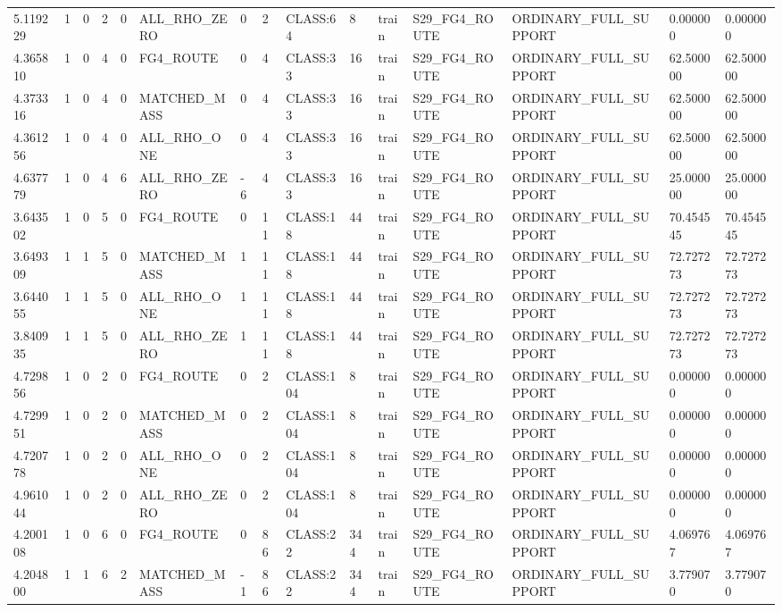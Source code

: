 \begin{tabular}{lllllllllllllll}
5.119229 & 1 & 0 & 2 & 0 & ALL\_RHO\_ZERO & 0 & 2 & CLASS:64 & 8 & train & S29\_FG4\_ROUTE & ORDINARY\_FULL\_SUPPORT & 0.000000 & 0.000000 \\
4.365810 & 1 & 0 & 4 & 0 & FG4\_ROUTE & 0 & 4 & CLASS:33 & 16 & train & S29\_FG4\_ROUTE & ORDINARY\_FULL\_SUPPORT & 62.500000 & 62.500000 \\
4.373316 & 1 & 0 & 4 & 0 & MATCHED\_MASS & 0 & 4 & CLASS:33 & 16 & train & S29\_FG4\_ROUTE & ORDINARY\_FULL\_SUPPORT & 62.500000 & 62.500000 \\
4.361256 & 1 & 0 & 4 & 0 & ALL\_RHO\_ONE & 0 & 4 & CLASS:33 & 16 & train & S29\_FG4\_ROUTE & ORDINARY\_FULL\_SUPPORT & 62.500000 & 62.500000 \\
4.637779 & 1 & 0 & 4 & 6 & ALL\_RHO\_ZERO & -6 & 4 & CLASS:33 & 16 & train & S29\_FG4\_ROUTE & ORDINARY\_FULL\_SUPPORT & 25.000000 & 25.000000 \\
3.643502 & 1 & 0 & 5 & 0 & FG4\_ROUTE & 0 & 11 & CLASS:18 & 44 & train & S29\_FG4\_ROUTE & ORDINARY\_FULL\_SUPPORT & 70.454545 & 70.454545 \\
3.649309 & 1 & 1 & 5 & 0 & MATCHED\_MASS & 1 & 11 & CLASS:18 & 44 & train & S29\_FG4\_ROUTE & ORDINARY\_FULL\_SUPPORT & 72.727273 & 72.727273 \\
3.644055 & 1 & 1 & 5 & 0 & ALL\_RHO\_ONE & 1 & 11 & CLASS:18 & 44 & train & S29\_FG4\_ROUTE & ORDINARY\_FULL\_SUPPORT & 72.727273 & 72.727273 \\
3.840935 & 1 & 1 & 5 & 0 & ALL\_RHO\_ZERO & 1 & 11 & CLASS:18 & 44 & train & S29\_FG4\_ROUTE & ORDINARY\_FULL\_SUPPORT & 72.727273 & 72.727273 \\
4.729856 & 1 & 0 & 2 & 0 & FG4\_ROUTE & 0 & 2 & CLASS:104 & 8 & train & S29\_FG4\_ROUTE & ORDINARY\_FULL\_SUPPORT & 0.000000 & 0.000000 \\
4.729951 & 1 & 0 & 2 & 0 & MATCHED\_MASS & 0 & 2 & CLASS:104 & 8 & train & S29\_FG4\_ROUTE & ORDINARY\_FULL\_SUPPORT & 0.000000 & 0.000000 \\
4.720778 & 1 & 0 & 2 & 0 & ALL\_RHO\_ONE & 0 & 2 & CLASS:104 & 8 & train & S29\_FG4\_ROUTE & ORDINARY\_FULL\_SUPPORT & 0.000000 & 0.000000 \\
4.961044 & 1 & 0 & 2 & 0 & ALL\_RHO\_ZERO & 0 & 2 & CLASS:104 & 8 & train & S29\_FG4\_ROUTE & ORDINARY\_FULL\_SUPPORT & 0.000000 & 0.000000 \\
4.200108 & 1 & 0 & 6 & 0 & FG4\_ROUTE & 0 & 86 & CLASS:22 & 344 & train & S29\_FG4\_ROUTE & ORDINARY\_FULL\_SUPPORT & 4.069767 & 4.069767 \\
4.204800 & 1 & 1 & 6 & 2 & MATCHED\_MASS & -1 & 86 & CLASS:22 & 344 & train & S29\_FG4\_ROUTE & ORDINARY\_FULL\_SUPPORT & 3.779070 & 3.779070 \\

\end{tabular}
